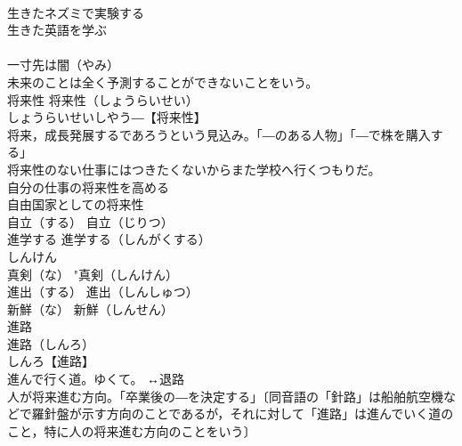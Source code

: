 \documentclass[8pt]{extreport}
\begin{document}
\begin{CJK}{UTF8}{min}
\\	生きたネズミで実験する
\\	生きた英語を学ぶ
\\	[(実際使われている) 
\\	(日常の) 
\\	彼は生きたまま埋められた
\\	生きた心地がしなかった
\\	はこの動作表現) 【命が縮むほどおびえた】
\\	いきぬく【生き抜く】
\\	【生き延びる】
\\	【切り抜ける】
\\	【生き残る】
\\	二つの戦争を生き抜く
\\	いきもの【生き物】
\\	｟集合的｠
\\	【植物を除く】
\\	（⇨生物）
\\	密林の生き物を殺す
\\	政治は生き物，一寸先は闇だ[分からない]
\\	一寸先は闇（やみ）
\\	未来のことは全く予測することができないことをいう。
\\	将来性		将来性（しょうらいせい）
\\	しょうらいせいしやう―【将来性】
\\	将来，成長発展するであろうという見込み。「―のある人物」「―で株を購入する」
\\	将来性のない仕事にはつきたくないからまた学校へ行くつもりだ。
\\	自分の仕事の将来性を高める
\\	自由国家としての将来性
\\	自立（する）		自立（じりつ）
\\	進学する		進学する（しんがくする）
\\	しんけん
\\	真剣（な）		"真剣（しんけん）
\\	進出（する）		進出（しんしゅつ）
\\	新鮮（な）		新鮮（しんせん）
\\	進路
\\	進路（しんろ）
\\	しんろ【進路】
\\	進んで行く道。ゆくて。 ↔退路
\\	人が将来進む方向。「卒業後の―を決定する」〔同音語の「針路」は船舶航空機などで羅針盤が示す方向のことであるが，それに対して「進路」は進んでいく道のこと，特に人の将来進む方向のことをいう〕

\end{CJK}
\end{document}
